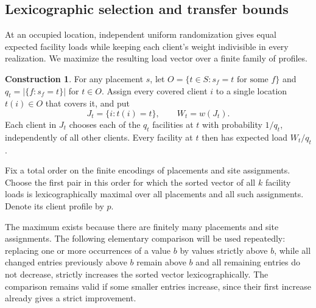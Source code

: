 \documentclass[11pt]{amsart}
\theoremstyle{definition}
\newtheorem{construction}[theorem]{Construction}
\newcommand{\set}[1]{\{#1\}}
\begin{document}
\subsection{Lexicographic selection and transfer bounds}\label{subsec:selection}
At an occupied location, independent uniform randomization gives equal expected facility loads while keeping each client's weight indivisible in every realization. We maximize the resulting load vector over a finite family of profiles.

\begin{construction}\label{con:selection}
For any placement $s$, let $O=\set{t\in S:s_f=t\text{ for some }f}$ and $q_t=|\set{f:s_f=t}|$ for $t\in O$. Assign every covered client $i$ to a single location $t(i)\in O$ that covers it, and put
\[
 J_t=\set{i:t(i)=t},\qquad W_t=w(J_t).
\]
Each client in $J_t$ chooses each of the $q_t$ facilities at $t$ with probability $1/q_t$, independently of all other clients. Every facility at $t$ then has expected load $W_t/q_t$.

Fix a total order on the finite encodings of placements and site assignments. Choose the first pair in this order for which the sorted vector of all $k$ facility loads is lexicographically maximal over all placements and all such assignments. Denote its client profile by $p$.
\end{construction}

The maximum exists because there are finitely many placements and site assignments. The following elementary comparison will be used repeatedly: replacing one or more occurrences of a value $b$ by values strictly above $b$, while all changed entries previously above $b$ remain above $b$ and all remaining entries do not decrease, strictly increases the sorted vector lexicographically. The comparison remains valid if some smaller entries increase, since their first increase already gives a strict improvement.
\end{document}
